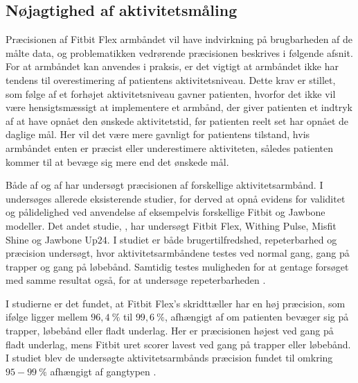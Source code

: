 \subsection{Nøjagtighed af aktivitetsmåling}

Præcisionen af Fitbit Flex armbåndet vil have indvirkning på brugbarheden af de målte data, og problematikken vedrørende præcisionen beskrives i følgende afsnit. For at armbåndet kan anvendes i praksis, er det vigtigt at armbåndet ikke har tendens til overestimering af patientens aktivitetsniveau. Dette krav er stillet, som følge af et forhøjet aktivitetsniveau gavner patienten, hvorfor det ikke vil være hensigtsmæssigt at implementere et armbånd, der giver patienten et indtryk af at have opnået den ønskede aktivitetstid, før patienten reelt set har opnået de daglige mål. Her vil det være mere gavnligt for patientens tilstand, hvis armbåndet enten er præcist eller underestimere aktiviteten, således patienten kommer til at bevæge sig mere end det ønskede mål.

Både  af \citeauthor{evenson2015} og  af \citeauthor{kaewkannate2016} har undersøgt præcisionen af forskellige aktivitetsarmbånd. I \citeauthor{evenson2015} undersøges allerede eksisterende studier, for derved at opnå evidens for validitet og pålidelighed ved anvendelse af eksempelvis forskellige Fitbit og Jawbone modeller. Det andet studie, \citeauthor{kaewkannate2016}, har undersøgt Fitbit Flex, Withing Pulse, Misfit Shine og Jawbone Up$24$. I studiet er både brugertilfredshed, repeterbarhed og præcision undersøgt, hvor aktivitetsarmbåndene testes ved normal gang, gang på trapper og gang på løbebånd. Samtidig testes muligheden for at gentage forsøget med samme resultat også, for at undersøge repeterbarheden \citep{evenson2015, kaewkannate2016}.

I studierne er det fundet, at Fitbit Flex's skridttæller har en høj præcision, som ifølge \citeauthor{kaewkannate2016} ligger mellem $96,4~\%$ til $99,6~\%$, afhængigt af om patienten bevæger sig på trapper, løbebånd eller fladt underlag. Her er præcisionen højest ved gang på fladt underlag, mens Fitbit uret scorer lavest ved gang på trapper eller løbebånd. I studiet blev de undersøgte aktivitetsarmbånds præcision fundet til omkring $95-99~\%$ afhængigt af gangtypen \citep{kaewkannate2016}.

